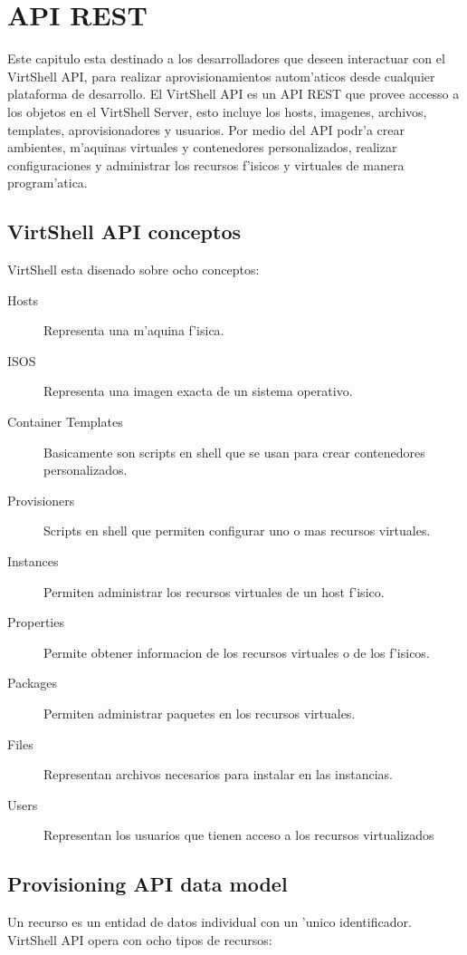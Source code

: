 \chapter{API REST}
\label{capapi}

Este capitulo esta destinado a los desarrolladores que deseen interactuar con el VirtShell API, para realizar aprovisionamientos autom'aticos desde cualquier plataforma de desarrollo. El VirtShell API es un API REST que provee accesso a los objetos en el VirtShell Server, esto incluye los hosts, imagenes, archivos, templates, aprovisionadores y usuarios. Por medio del API podr'a crear ambientes, m'aquinas virtuales y contenedores personalizados, realizar configuraciones y administrar los recursos f'isicos y virtuales de manera program'atica. 

\section{VirtShell API conceptos}
VirtShell esta disenado sobre ocho conceptos:

\begin{description}
\item [Hosts] Representa una m'aquina f'isica.
\item [ISOS] Representa una imagen exacta de un sistema operativo.
\item [Container Templates] Basicamente son scripts en shell que se usan para crear contenedores personalizados.
\item [Provisioners] Scripts en shell que permiten configurar uno o mas recursos virtuales.
\item [Instances] Permiten administrar los recursos virtuales de un host f'isico.
\item [Properties] Permite obtener informacion de los recursos virtuales o de los f'isicos.
\item [Packages] Permiten administrar paquetes en los recursos virtuales.
\item [Files] Representan archivos necesarios para instalar en las instancias.
\item [Users] Representan los usuarios que tienen acceso a los recursos virtualizados
\end{description}

\section{Provisioning API data model}
Un recurso es un entidad de datos individual con un 'unico identificador. VirtShell API opera con ocho tipos de recursos:

